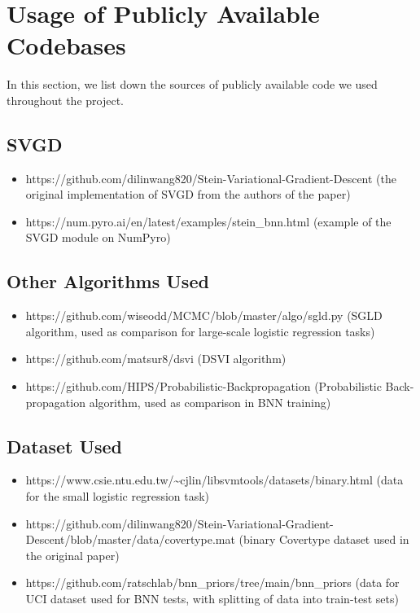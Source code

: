 \section{Usage of Publicly Available Codebases}
In this section, we list down the sources of publicly available code we used throughout the project.
\subsection{SVGD}
\begin{itemize}
    \item https://github.com/dilinwang820/Stein-Variational-Gradient-Descent (the original implementation of SVGD from the authors of the paper)
    \item https://num.pyro.ai/en/latest/examples/stein\_bnn.html (example of the SVGD module on NumPyro)
\end{itemize}

\subsection{Other Algorithms Used}
\begin{itemize}
    \item https://github.com/wiseodd/MCMC/blob/master/algo/sgld.py (SGLD algorithm, used as comparison for large-scale logistic regression tasks)
    \item https://github.com/matsur8/dsvi (DSVI algorithm)
    \item https://github.com/HIPS/Probabilistic-Backpropagation (Probabilistic Back-propagation algorithm, used as comparison in BNN training)
\end{itemize}

\subsection{Dataset Used}
\begin{itemize}
    \item https://www.csie.ntu.edu.tw/\textasciitilde cjlin/libsvmtools/datasets/binary.html (data for the small logistic regression task)
    
    \item https://github.com/dilinwang820/Stein-Variational-Gradient-Descent/blob/master/data/covertype.mat (binary Covertype dataset used in the original paper)
    
    \item https://github.com/ratschlab/bnn\_priors/tree/main/bnn\_priors (data for UCI dataset used for BNN tests, with splitting of data into train-test sets)
\end{itemize}